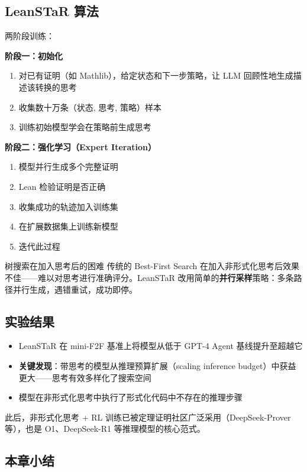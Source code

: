 \documentclass[a4paper]{article}
\begin{document}
\subsection{LeanSTaR 算法}

两阶段训练：

\textbf{阶段一：初始化}
\begin{enumerate}
    \item 对已有证明（如 Mathlib），给定状态和下一步策略，让 LLM 回顾性地生成描述该转换的思考
    \item 收集数十万条（状态, 思考, 策略）样本
    \item 训练初始模型学会在策略前生成思考
\end{enumerate}

\textbf{阶段二：强化学习（Expert Iteration）}
\begin{enumerate}
    \item 模型并行生成多个完整证明
    \item Lean 检验证明是否正确
    \item 收集成功的轨迹加入训练集
    \item 在扩展数据集上训练新模型
    \item 迭代此过程
\end{enumerate}

\begin{warningbox}{树搜索在加入思考后的困难}
传统的 Best-First Search 在加入非形式化思考后效果不佳——难以对思考进行准确评分。LeanSTaR 改用简单的\textbf{并行采样}策略：多条路径并行生成，遇错重试，成功即停。
\end{warningbox}

\subsection{实验结果}

\begin{itemize}
    \item LeanSTaR 在 mini-F2F 基准上将模型从低于 GPT-4 Agent 基线提升至超越它
    \item \textbf{关键发现}：带思考的模型从推理预算扩展（scaling inference budget）中获益更大——思考有效多样化了搜索空间
    \item 模型在非形式化思考中执行了形式化代码中不存在的推理步骤
\end{itemize}

此后，非形式化思考 + RL 训练已被定理证明社区广泛采用（DeepSeek-Prover 等），也是 O1、DeepSeek-R1 等推理模型的核心范式。

\subsection{本章小结}
\end{document}
